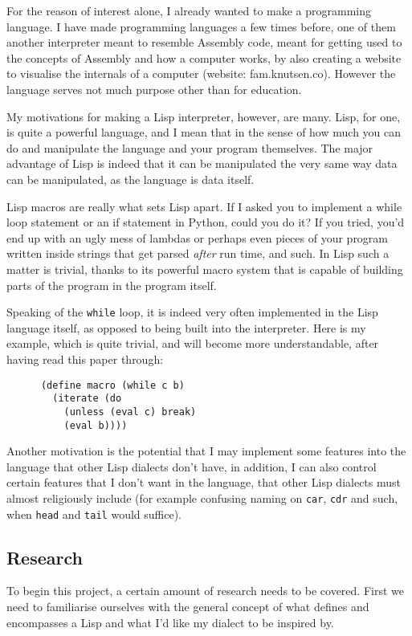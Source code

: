 \documentclass{article}
\newcommand{\code}[1]{\texttt{#1}}
\begin{document}
    For the reason of interest alone, I already wanted to make a programming
    language.  I have made programming languages a few times before, one of them
    another interpreter meant to resemble Assembly code, meant for getting
    used to the concepts of Assembly and how a computer works, by also creating
    a website to visualise the internals of a computer (website: fam.knutsen.co).
    However the language serves not much purpose other than for education.

    My motivations for making a Lisp interpreter, however, are many.
    Lisp, for one, is quite a powerful language, and I mean that in the sense
    of how much you can do and manipulate the language and your program themselves.
    The major advantage of Lisp is indeed that it can be manipulated the very
    same way data can be manipulated, as the language is data itself.

    Lisp macros are really what sets Lisp apart. If I asked you to implement
    a while loop statement or an if statement in Python, could you do it?
    If you tried, you'd end up with an ugly mess of lambdas or perhaps even pieces
    of your program written inside strings that get parsed \emph{after} run time, and
    such.  In Lisp such a matter is trivial, thanks to its powerful macro system
    that is capable of building parts of the program in the program itself.

    \clearpage

    Speaking of the \code{while} loop, it is indeed very often implemented
    in the Lisp language itself, as opposed to being built into the interpreter.
    Here is my example, which is quite trivial, and will become more
    understandable, after having read this paper through:

    \begin{verbatim}
      (define macro (while c b)
        (iterate (do
          (unless (eval c) break)
          (eval b))))
    \end{verbatim}


    Another motivation is the potential that I may implement some features
    into the language that other Lisp dialects don't have, in addition, I can
    also control certain features that I don't want in the language, that
    other Lisp dialects must almost religiously include (for example
    confusing naming on \code{car}, \code{cdr} and such, when \code{head}
    and \code{tail} would suffice).

  \subsection{Research}
    To begin this project, a certain amount of research needs to be covered.
    First we need to familiarise ourselves with the general concept of what
    defines and encompasses a Lisp and what I'd like my dialect to be
    inspired by.
\end{document}
